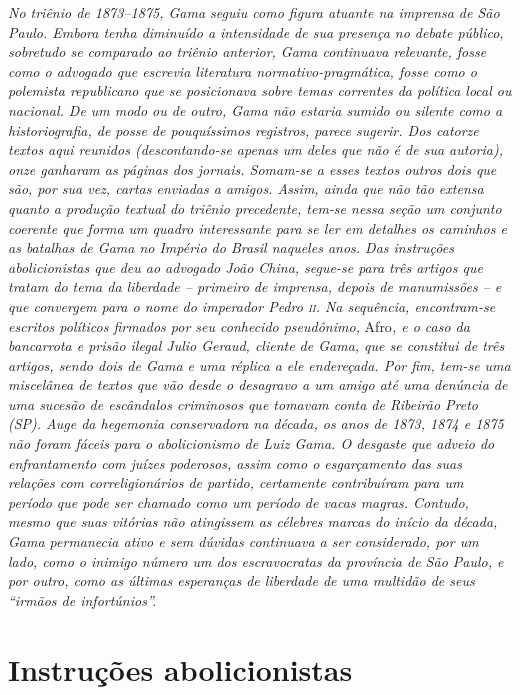 \begin{didascalia}
\emph{No triênio de 1873--1875, Gama seguiu como figura atuante na
imprensa de São Paulo. Embora tenha diminuído a intensidade de sua
presença no debate público, sobretudo se comparado ao triênio anterior,
Gama continuava relevante, fosse como o advogado que escrevia literatura
normativo-pragmática, fosse como o polemista republicano que se
posicionava sobre temas correntes da política local ou nacional. De um
modo ou de outro, Gama não estaria sumido ou silente como a
historiografia, de posse de pouquíssimos registros, parece sugerir. Dos
catorze textos aqui reunidos (descontando-se apenas um deles que não é
de sua autoria), onze ganharam as páginas dos jornais. Somam-se a esses
textos outros dois que são, por sua vez, cartas enviadas a amigos.
Assim, ainda que não tão extensa quanto a produção textual do triênio
precedente, tem-se nessa seção um conjunto coerente que forma um quadro
interessante para se ler em detalhes os caminhos e as batalhas de Gama
no Império do Brasil naqueles anos. Das instruções abolicionistas que
deu ao advogado João China, segue-se para três artigos que tratam do
tema da liberdade -- primeiro de imprensa, depois de manumissões -- e
que convergem para o nome do imperador Pedro \textsc{ii}. Na sequência,
encontram-se escritos políticos firmados por seu conhecido pseudônimo,}
Afro\emph{, e o caso da bancarrota e prisão ilegal Julio Geraud, cliente
de Gama, que se constitui de três artigos, sendo dois de Gama e uma
réplica a ele endereçada. Por fim, tem-se uma miscelânea de textos que
vão desde o desagravo a um amigo até uma denúncia de uma sucesão de
escândalos criminosos que tomavam conta de Ribeirão Preto (SP). Auge da
hegemonia conservadora na década, os anos de 1873, 1874 e 1875 não foram
fáceis para o abolicionismo de Luiz Gama. O desgaste que adveio do
enfrantamento com juízes poderosos, assim como o esgarçamento das suas
relações com correligionários de partido, certamente contribuíram para
um período que pode ser chamado como um período de vacas magras.
Contudo, mesmo que suas vitórias não atingissem as célebres marcas do
início da década, Gama permanecia ativo e sem dúvidas continuava a ser
considerado, por um lado, como o inimigo número um dos escravocratas da
província de São Paulo, e por outro, como as últimas esperanças de
liberdade de uma multidão de seus ``irmãos de infortúnios''.}
\end{didascalia}

\part{Instruções abolicionistas}

